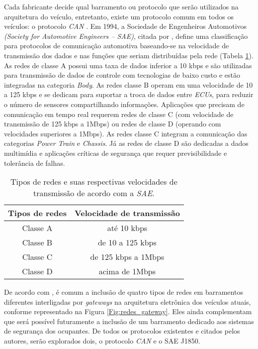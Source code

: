 Cada fabricante decide qual barramento ou protocolo que serão utilizados na arquitetura do veículo, entretanto, existe um protocolo comum em todos os veículos: o protocolo \textit{CAN} \cite{smith}. Em 1994, a Sociedade de Engenheiros Automotivos \textit{(Society for Automotive Engineers – SAE)}, citada por , define uma classificação para protocolos de comunicação automotiva baseando-se na velocidade de transmissão dos dados e nas funções que seriam distribuídas pela rede (Tabela \ref{tab:tipos_redes_transmissao}). As redes de classe A possui uma taxa de dados inferior a 10 kbps e são utilizadas para transmissão de dados de controle com tecnologias de baixo custo e estão integradas na categoria \textit{Body}. As redes classe B operam em uma velocidade de 10 a 125 kbps e se dedicam para suportar a troca de dados entre \textit{ECUs}, para reduzir o número de sensores compartilhando informações. Aplicações que precisam de comunicação em tempo real requerem redes de classe C (com velocidade de transmissão de 125 kbps a 1Mbps) ou redes de classe D (operando com velocidades superiores a 1Mbps). As redes classe C integram a comunicação das categorias \textit{Power Train} e \textit{Chassis}. Já as redes de classe D são dedicadas a dados multimídia e aplicações críticas de segurança que requer previsibilidade e tolerância de falhas.

\begin{table}[htb!]
\centering
\caption{Tipos de redes e suas respectivas velocidades de transmissão de acordo com a \textit{SAE}.}
\label{tab:tipos_redes_transmissao}
\begin{tabular}{cc}
\hline
Tipos de redes & \multicolumn{1}{c}{Velocidade de transmissão} \\ \hline
Classe A              & até 10 kbps                             \\
Classe B              & de 10 a 125 kbps                          \\
Classe C              & de 125 kbps a 1Mbps                       \\
Classe D              & acima de 1Mbps                            \\ \hline
\end{tabular}
\end{table}

De acordo com , é comum a inclusão de quatro tipos de redes em barramentos diferentes interligadas por \textit{gateways} na arquitetura eletrônica dos veículos atuais, conforme representado na Figura \ref{Fig:redes_gateway}. Eles ainda complementam que será possível futuramente a inclusão de um barramento dedicado aos sistemas de segurança dos ocupantes. De todos os protocolos existentes e citados pelos autores, serão explorados dois, o protocolo \textit{CAN} e o SAE J1850.

